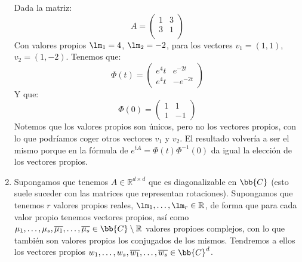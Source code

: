 \begin{enumerate}
        \begin{ejemplo}
            Dada la matriz:
            \begin{equation*}
                A = \left(\begin{array}{cc}
                        1 & 3 \\
                        3 & 1 \\
                \end{array}\right)
            \end{equation*}
            Con valores propios $\lm_1=4$, $\lm_2=-2$, para los vectores $v_1=(1,1)$, $v_2=(1,-2)$. Tenemos que:
            \begin{equation*}
                \Phi(t) = \left(\begin{array}{cc}
                        e^4t & e^{-2t} \\
                        e^4t & -e^{-2t} 
                \end{array}\right)
            \end{equation*}
            Y que:
            \begin{equation*}
                \Phi(0) = \left(\begin{array}{cc}
                        1 & 1 \\
                        1 & -1
                \end{array}\right)
            \end{equation*}
        Notemos que los valores propios son únicos, pero no los vectores propios, con lo que podríamos coger otros vectores $v_1$ y $v_2$. El resultado volvería a ser el mismo porque en la fórmula de $e^{tA} = \Phi(t)\Phi^{-1}(0)$ da igual la elección de los vectores propios.
        \end{ejemplo}
    \item Supongamos que tenemos $A\in \mathbb{R}^{d\times d}$ que es diagonalizable en $\bb{C}$ (esto suele suceder con las matrices que representan rotaciones). Supongamos que tenemos $r$ valores propios reales, $\lm_1,\ldots,\lm_r\in \mathbb{R}$, de forma que para cada valor propio tenemos vectores propios, así como $\mu_1,\ldots,\mu_s,\overline{\mu_1},\ldots,\overline{\mu_s}\in \bb{C}\setminus \mathbb{R}$ valores propioes complejos, con lo que también son valores propios los conjugados de los mismos. Tendremos a ellos los vectores propios $w_1,\ldots,w_s,\overline{w_1},\ldots,\overline{w_s}\in \bb{C}^d$.


\end{enumerate}
